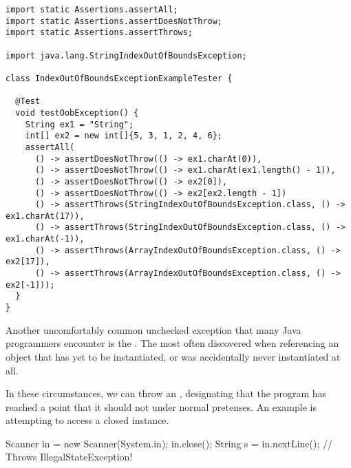 \begin{lstlisting}[language=MyJava]
import static Assertions.assertAll;
import static Assertions.assertDoesNotThrow;
import static Assertions.assertThrows;

import java.lang.StringIndexOutOfBoundsException;

class IndexOutOfBoundsExceptionExampleTester {

  @Test
  void testOobException() {
    String ex1 = "String";
    int[] ex2 = new int[]{5, 3, 1, 2, 4, 6}; 
    assertAll(
      () -> assertDoesNotThrow(() -> ex1.charAt(0)),
      () -> assertDoesNotThrow(() -> ex1.charAt(ex1.length() - 1)),
      () -> assertDoesNotThrow(() -> ex2[0]),
      () -> assertDoesNotThrow(() -> ex2[ex2.length - 1])
      () -> assertThrows(StringIndexOutOfBoundsException.class, () -> ex1.charAt(17)),
      () -> assertThrows(StringIndexOutOfBoundsException.class, () -> ex1.charAt(-1)),
      () -> assertThrows(ArrayIndexOutOfBoundsException.class, () -> ex2[17]),
      () -> assertThrows(ArrayIndexOutOfBoundsException.class, () -> ex2[-1]));
  } 
}
\end{lstlisting} 

Another uncomfortably common unchecked exception that many Java programmers encounter is the . 
The  most often discovered when referencing an object that has yet to be instantiated, or was accidentally never instantiated at all.


In these circumstances, we can throw an , designating that the program has reached a point that it should not under normal pretenses. 
An example is attempting to access a closed  instance.
\begin{verbnobox}[\small]
Scanner in = new Scanner(System.in);
in.close();
String s = in.nextLine(); // Throws IllegalStateException!
\end{verbnobox}
